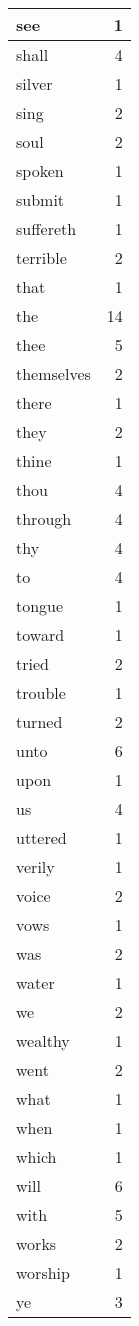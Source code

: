 \begin{center}
\begin{longtable}{l|r}
see & 1 \\ \hline
shall & 4 \\ \hline
silver & 1 \\ \hline
sing & 2 \\ \hline
soul & 2 \\ \hline
spoken & 1 \\ \hline
submit & 1 \\ \hline
suffereth & 1 \\ \hline
terrible & 2 \\ \hline
that & 1 \\ \hline
the & 14 \\ \hline
thee & 5 \\ \hline
themselves & 2 \\ \hline
there & 1 \\ \hline
they & 2 \\ \hline
thine & 1 \\ \hline
thou & 4 \\ \hline
through & 4 \\ \hline
thy & 4 \\ \hline
to & 4 \\ \hline
tongue & 1 \\ \hline
toward & 1 \\ \hline
tried & 2 \\ \hline
trouble & 1 \\ \hline
turned & 2 \\ \hline
unto & 6 \\ \hline
upon & 1 \\ \hline
us & 4 \\ \hline
uttered & 1 \\ \hline
verily & 1 \\ \hline
voice & 2 \\ \hline
vows & 1 \\ \hline
was & 2 \\ \hline
water & 1 \\ \hline
we & 2 \\ \hline
wealthy & 1 \\ \hline
went & 2 \\ \hline
what & 1 \\ \hline
when & 1 \\ \hline
which & 1 \\ \hline
will & 6 \\ \hline
with & 5 \\ \hline
works & 2 \\ \hline
worship & 1 \\ \hline
ye & 3 \\ \hline
\end{longtable}
\end{center}



